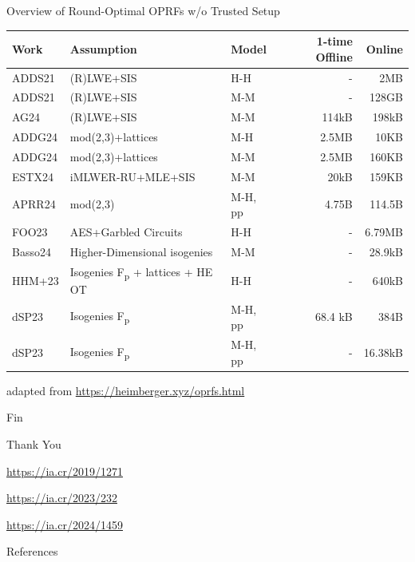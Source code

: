 \documentclass[xcolor=table,10pt,aspectratio=169]{beamer}
\begin{document}
\begin{frame}[label={sec:orgb0f2ca8}]{Overview of Round-Optimal OPRFs w/o Trusted Setup}
\begin{small}

\begin{center}
\begin{tabular}{lllrr}
\toprule
Work & Assumption & Model & 1-time Offline & Online\\
\midrule
ADDS21 & (R)LWE+SIS & H-H & - & 2MB\\
ADDS21 & (R)LWE+SIS & M-M & - & 128GB\\
\rowcolor{gamechangecolor} AG24 & (R)LWE+SIS & M-M & 114kB & 198kB\\
\rowcolor{gamechangecolor} ADDG24 & mod(2,3)+lattices & M-H & 2.5MB & 10KB\\
\rowcolor{gamechangecolor} ADDG24 & mod(2,3)+lattices & M-M & 2.5MB & 160KB\\
ESTX24 & iMLWER-RU+MLE+SIS & M-M & 20kB & 159KB\\
APRR24 & mod(2,3) & M-H, pp & 4.75B & 114.5B\\
FOO23 & AES+Garbled Circuits & H-H & - & 6.79MB\\
Basso24 & Higher-Dimensional isogenies & M-M & - & 28.9kB\\
HHM+23 & Isogenies F\textsubscript{p} + lattices + HE OT & H-H & - & 640kB\\
dSP23 & Isogenies F\textsubscript{p} & M-H, pp & 68.4 kB & 384B\\
dSP23 & Isogenies F\textsubscript{p} & M-H, pp & - & 16.38kB\\
\bottomrule
\end{tabular}

\end{center}

\end{small}

\begin{center}
{\footnotesize adapted from \url{https://heimberger.xyz/oprfs.html} \par}
\end{center}
\end{frame}
\begin{frame}[label={sec:orgb23380c},standout]{Fin}
\begin{center}
{\Huge\alert{Thank You}\par}

\url{https://ia.cr/2019/1271}

\url{https://ia.cr/2023/232}

\url{https://ia.cr/2024/1459}
\end{center}
\end{frame}
\begin{frame}[allowframebreaks]{References}
\renewcommand*{\bibfont}{\scriptsize}
\printbibliography[heading=none]
\end{frame}
\end{document}
